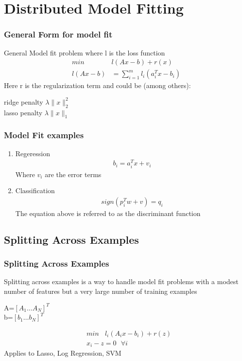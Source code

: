 \documentclass{beamer}
\begin{document}
\section{Distributed Model Fitting}

\begin{frame}
  \frametitle{General Form for model fit}
  General Model fit problem where l is the loss function
  \begin{align}
    min \: \: \: \:& l(Ax-b) + r(x) \\
    l(Ax-b) &= \sum_{i=1}^{m} l_{i} (a_{i}^{T}x - b_{i})
  \end{align}
  Here r is the regularization term and could be (among others): \\
  
  \begin{center}
  ridge penalty $\lambda \|x\|_{2}^{2}$ \\
  lasso penalty $\lambda \|x\|_{1}$
  \end{center}
\end{frame}

\begin{frame}
  \frametitle{Model Fit examples}
  \begin{enumerate}[1)]
    \item Regeression
      \begin{align}
	b_{i} = a_{i}^{T}x + v_{i}
      \end{align}
      Where $v_{i}$ are the error terms
    \item Classification
      \begin{align}
	sign(p_{i}^{T}w + v) = q_{i}
      \end{align}
      The equation above is referred to as the discriminant function
  \end{enumerate}
\end{frame}

\subsection{Splitting Across Examples}

\begin{frame}
  \frametitle{Splitting Across Examples}
  Splitting across examples is a way to handle model fit problems with a modest number of features but a very large number of training examples
  \begin{center}
    A=$[ A_{1} \ldots A_{N} ]^{T}$ \\
    b=$[b_{1} \ldots b_{N} ]^{T}$
  \end{center}
  \begin{align}
    &min \: \: \: \: l_{i} (A_{i}x-b_{i}) + r(z) \\
    & x_{i} - z = 0 \: \: \: \forall i
    \label{}
  \end{align}
  Applies to Lasso, Log Regression, SVM
\end{frame}
\end{document}
